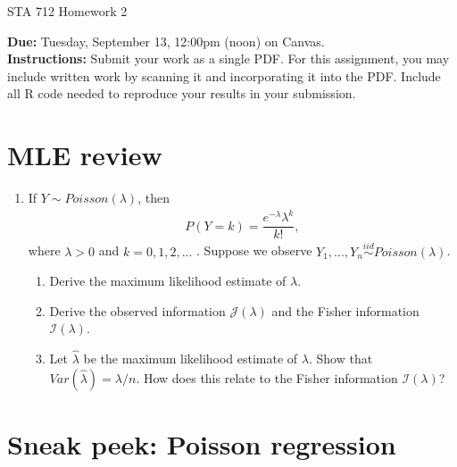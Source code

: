\documentclass[11pt]{article}
\begin{document}
\begin{center}
\Large
STA 712 Homework 2\\
\normalsize
\vspace{5mm}
\end{center}

\noindent \textbf{Due:} Tuesday, September 13, 12:00pm (noon) on Canvas.\\ 

\noindent \textbf{Instructions:} Submit your work as a single PDF. For this assignment, you may include written work by scanning it and incorporating it into the PDF. Include all R code needed to reproduce your results in your submission.

\section*{MLE review}

\begin{enumerate}
\item If $Y \sim Poisson(\lambda)$, then
\begin{align*}
P(Y = k) = \dfrac{e^{-\lambda} \lambda^k}{k!},
\end{align*}
where $\lambda > 0$ and $k = 0, 1, 2, ...$ . Suppose we observe $Y_1,...,Y_n \overset{iid}{\sim} Poisson(\lambda)$.

\begin{enumerate}
\item Derive the maximum likelihood estimate of $\lambda$.
\item Derive the observed information $\mathcal{J}(\lambda)$ and the Fisher information $\mathcal{I}(\lambda)$.
\item Let $\widehat{\lambda}$ be the maximum likelihood estimate of $\lambda$. Show that $Var(\widehat{\lambda}) = \lambda / n$. How does this relate to the Fisher information $\mathcal{I}(\lambda)$?
\end{enumerate}
\end{enumerate}

\section*{Sneak peek: Poisson regression}
\end{document}
